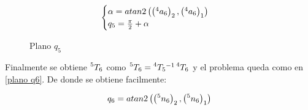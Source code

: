 \documentclass[a4paper,12pt]{article}
\begin{document}
\begin{align}
    \begin{cases}
        \alpha = atan2\left(\left(\prescript{4}{}{a_6}\right)_2, \left(\prescript{4}{}{a_6}\right)_1\right)\\
        q_5    = \frac{\pi}{2} + \alpha
    \end{cases}
    \label{q5}
\end{align}

\begin{figure}[H]
    \centering
    \begin{adjustbox}{max width=\columnwidth}
    \end{adjustbox}
    \caption{Plano $q_{5}$}
    \label{plano q5}
\end{figure}

Finalmente se obtiene $\prescript{5}{}{T_6}$ como $\prescript{5}{}{T_6} = \prescript{4}{}{T_5}^{-1}\prescript{4}{}{T_6}$ y el problema
queda como en \cref{plano q6}. De donde se obtiene facilmente:

\begin{align}
    q_6 = atan2\left(\left(\prescript{5}{}{n_6}\right)_2, \left(\prescript{5}{}{n_6}\right)_1\right)\\
    \label{q6}
\end{align}
\end{document}
